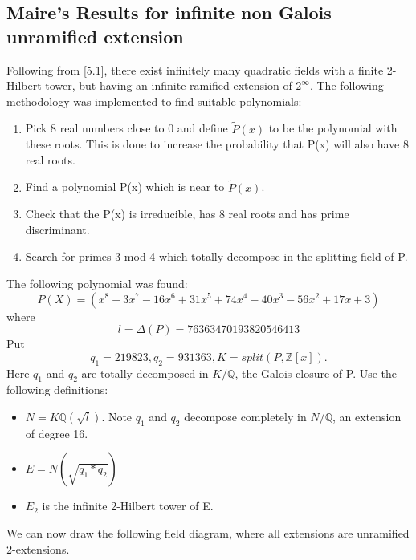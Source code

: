 \documentclass[preprint,12pt,leqno]{elsarticle}
\begin{document}
\subsection{Maire's Results for infinite non Galois unramified extension}
Following from \cite{MAIR}[5.1], there exist infinitely many quadratic fields with a finite 2-Hilbert tower, but having an infinite ramified extension of $2^{\infty{}}$. 
The following methodology was implemented  to find suitable polynomials:
\newline
\begin{enumerate}
    \item Pick 8 real numbers close to 0 and define $\tilde{P}(x)$ to be the polynomial with these roots. This is done to increase the probability that P(x) will also have 8 real roots. 
    \item Find a polynomial P(x) which is near to $\tilde{P}(x)$.
    \item Check that the P(x) is irreducible, has 8 real roots and has prime discriminant. 
    \item Search for primes 3 mod 4 which totally decompose in the splitting field of P. 
\end{enumerate}
The following polynomial was found: 
\begin{equation}
    P(X) = (x^8 - 3x^7 - 16x^6 + 31x^5 + 74x^4 - 40x^3 - 56x^2 + 17x + 3)

\end{equation}
where 
\begin{equation}
    l = \Delta(P) = 76363470193820546413

\end{equation}
Put \begin{equation}
    q_1 = 219823, q_2 = 931363, K = split(P, \mathbb{Z}[x]).
\end{equation}
\newline
Here $q_1$ and  $q_2$ are totally decomposed in $K/\mathbb{Q}$, the Galois closure of P.
\newline
Use the following definitions: 
\begin{itemize}
    \item $N = K\mathbb{Q}(\sqrt{l})$. Note $q_1$ and $q_2$ decompose completely in $N/\mathbb{Q}$, an extension of degree 16.
    \item $E = N(\sqrt{q_1*q_2})$
    \item $E_2$ is the infinite 2-Hilbert tower of E.
\end{itemize}
\newline 
We can now draw the following field diagram, where all extensions are unramified 2-extensions. 
\end{document}
